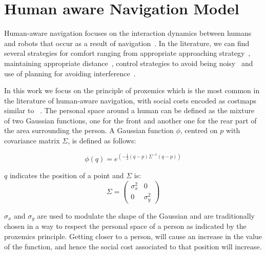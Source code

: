 \section{Human aware Navigation Model}
Human-aware navigation focuses on the interaction dynamics between humans and robots that occur as a result of navigation~\cite{Kruse2013}. 
In the literature, we can find several strategies for comfort ranging from appropriate approaching strategy~\cite{Dautenhahn2006}, maintaining appropriate distance~\cite{Takayama2009}, control strategies to avoid being noisy~\cite{Martinson2007} and use of planning for avoiding interference~\cite{Vasquez2012}.

In this work we focus on the principle of proxemics which is the most common in the literature of human-aware navigation, with social costs encoded as costmaps similar to ~\cite{gomez2013social}. The personal space around a human can be defined as the mixture of two Gaussian functions, one for the front and another one for the rear part of the area surrounding the person.
A Gaussian function $\phi$, centred on $p$ with covariance matrix $\Sigma$, is defined as follows:

\begin{equation}
\phi(q) = e^{(-\frac{1}{2}(q-p)\Sigma^{-1}(q-p))}
\end{equation}

$q$ indicates the position of a point and $\Sigma$ is:
\begin{equation}
\Sigma = \begin{pmatrix}
{\sigma}_{x}^2  & 0\\ 
 0& {\sigma}_{y}^2 
\end{pmatrix}
\end{equation}

${\sigma}_{x}$ and ${\sigma}_{y}$ are used to modulate the shape of the Gaussian and are traditionally chosen in a way to respect the personal space of a person as indicated by the proxemics principle. Getting closer to a person, will cause an increase in the value of the function, and hence the social cost associated to that position will increase.


